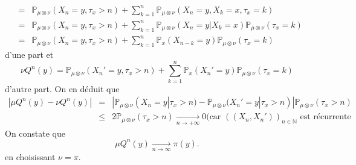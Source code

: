 \documentclass[8pt,notheorems]{beamer}
\def \N{\mathbb N}
\renewcommand{\Pr}{\mathbb{P}}
\theoremstyle{definition}
\theoremstyle{example}
\theoremstyle{mystyle}
\theoremstyle{plain}
\begin{document}
\begin{frame}[allowframebreaks]
\begin{eqnarray*}
&=&\Pr_{\mu\otimes\nu}(X_n=y,\tau_x>n)+\sum_{k=1}^{n}\Pr_{\mu\otimes\nu}(X_n=y,X_k=x,\tau_x=k)\\
&=&\Pr_{\mu\otimes\nu}(X_n=y,\tau_x>n)+\sum_{k=1}^{n}\Pr_{\mu\otimes\nu}(X_n=y|X_k=x)\Pr_{\mu\otimes\nu}(\tau_x=k)\\
&=&\Pr_{\mu\otimes\nu}(X_n=y,\tau_x>n)+\sum_{k=1}^{n}\Pr_{x}(X_{n-k}=y)\Pr_{\mu\otimes\nu}(\tau_x=k)
\end{eqnarray*}
d'une part et
$$
\nu Q^{n}(y)=\Pr_{\mu\otimes\nu}(X_n'=y,\tau_x>n)+\sum_{k=1}^{n}\Pr_{x}(X_{n}'=y)\Pr_{\mu\otimes\nu}(\tau_x=k)
$$
d'autre part. On en déduit que
\begin{eqnarray}
|\mu Q^{n}(y)-\nu Q^{n}(y)|&=&|\Pr_{\mu\otimes\nu}(X_n=y|\tau_x>n)-\Pr_{\mu\otimes\nu}(X_n'=y|\tau_x>n)|\Pr_{\mu\otimes\nu}(\tau_x>n)\\
&\leq& 2\Pr_{\mu\otimes\nu}(\tau_x>n)\underset{n\rightarrow +\infty}{\rightarrow} 0 \text{(car $((X_n,X_n'))_{n\in \N}$ est récurrente}
\end{eqnarray}
On constate que
$$
\mu Q^{n}(y) \underset{n\longrightarrow\infty}{\rightarrow} \pi(y).
$$
en choisissant $\nu=\pi$.


\end{frame}

\end{document}
